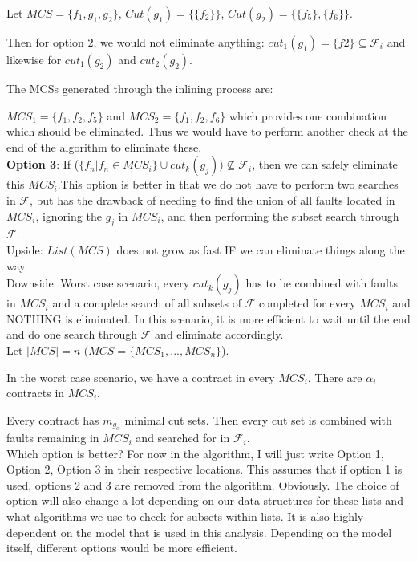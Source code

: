Let $MCS = \{f_1,g_1,g_2\}$,  $Cut(g_1) = \{\{f_2\}\}$, $Cut(g_2) = \{\{f_5\},\{f_6\}\}$.

Then for option 2, we would not eliminate anything: $cut_1(g_1) = \{f2\} \subseteq \mathcal{F}_i$ and likewise for $cut_1(g_2)$ and $cut_2(g_2)$. 

The MCSs generated through the inlining process are: 

$MCS_1 = \{f_1,f_2,f_5\}$ and $MCS_2 = \{f_1,f_2,f_6\}$ which provides one combination which should be eliminated. Thus we would have to perform another check at the end of the algorithm to eliminate these. \\


\textbf{Option 3}: If ($\{f_n | f_n \in MCS_i\} \cup cut_k(g_j)) \not \subseteq  \mathcal{F}_i $, then we can safely eliminate this $MCS_i$.This option is better in that we do not have to perform two searches in $\mathcal{F}$, but has the drawback of needing to find the union of all faults located in $MCS_i$, ignoring the $g_j$ in $MCS_i$, and then performing the subset search through $\mathcal{F}$. \\

Upside: $List(MCS)$ does not grow as fast IF we can eliminate things along the way.\\

Downside: Worst case scenario, every $cut_k(g_j)$ has to be combined with faults in $MCS_i$ and a complete search of all subsets of $\mathcal{F}$ completed for every $MCS_i$ and NOTHING is eliminated. In this scenario, it is more efficient to wait until the end and do one search through $\mathcal{F}$ and eliminate accordingly. \\

Let $|MCS| = n$ ($MCS = \{MCS_1,...,MCS_n\}$). 

In the worst case scenario, we have a contract in every $MCS_i$. There are $\alpha_i$ contracts in $MCS_i$. 

Every contract has $m_{g_\alpha}$ minimal cut sets. Then every cut set is combined with faults remaining in $MCS_i$ and searched for in $\mathcal{F}_i$. \\ 



Which option is better? For now in the algorithm, I will just write Option 1, Option 2, Option 3 in their respective locations. This assumes that if option 1 is used, options 2 and 3 are removed from the algorithm. Obviously. The choice of option will also change a lot depending on our data structures for these lists and what algorithms we use to check for subsets within lists. It is also highly dependent on the model that is used in this analysis. Depending on the model itself, different options would be more efficient. \\

